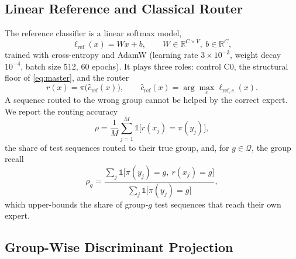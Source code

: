 \documentclass[conference]{IEEEtran}
\begin{document}
\subsection{Linear Reference and Classical Router}
\label{sec:router}

The reference classifier is a linear softmax model,
\begin{equation}
    \ell_{\mathrm{ref}}(x)=Wx+b,\qquad W\in\mathbb{R}^{C\times V},\ b\in\mathbb{R}^{C},
    \label{eq:reference}
\end{equation}
trained with cross-entropy and AdamW (learning rate $3\times10^{-3}$, weight decay $10^{-4}$, batch size 512, 60 epochs). It plays three roles: control C0, the structural floor of \eqref{eq:master}, and the router
\begin{equation}
    r(x)=\pi\big(\hat{c}_{\mathrm{ref}}(x)\big),\qquad \hat{c}_{\mathrm{ref}}(x)=\arg\max_{c}\ell_{\mathrm{ref},c}(x).
    \label{eq:router}
\end{equation}
A sequence routed to the wrong group cannot be helped by the correct expert. We report the routing accuracy
\begin{equation}
    \rho=\frac{1}{M}\sum_{j=1}^{M}\mathbb{1}\big[r(x_j)=\pi(y_j)\big],
    \label{eq:routing-accuracy}
\end{equation}
the share of test sequences routed to their true group, and, for $g\in\mathcal{Q}$, the group recall
\begin{equation}
    \rho_g=\frac{\sum_{j}\mathbb{1}\big[\pi(y_j)=g,\ r(x_j)=g\big]}{\sum_{j}\mathbb{1}\big[\pi(y_j)=g\big]},
    \label{eq:routing-recall}
\end{equation}
which upper-bounds the share of group-$g$ test sequences that reach their own expert.

\subsection{Group-Wise Discriminant Projection}
\label{sec:projection}
\end{document}
